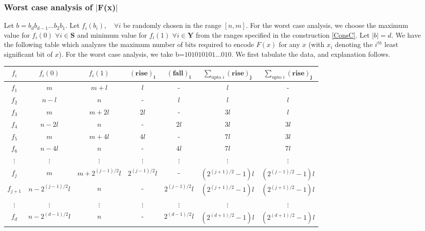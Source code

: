 \documentclass[11pt, letterpaper, romanappendices, onecolumn]{article}
\theoremstyle{plain}\newtheorem{thm}{Theorem}[section]
\theoremstyle{definition}
\theoremstyle{remark}
\begin{document}
\subsubsection{Worst case analysis of $\mid$F(x)$\mid$}
\par  Let $b=b_d b_{d-1}\ldots b_2 b_1$. Let $f_i (b_i),\quad \forall i$ be randomly chosen in the range $[n, m]$. For the worst case analysis, we choose the maximum value for $f_i(0)$ $\forall i \in \mathbf{S}$ and minimum value for $f_i(1)$ $\forall i \in \mathbf{Y}$ from the ranges specified in the construction \ref{ConsC}. Let $| b | = d$. We have the following table which analyzes the maximum number of bits required to encode $F(x)$ for any $x$ (with $x_i$ denoting the $i^{th}$ least significant bit of $x$). For the worst case analysis, we take b=$101010101 \ldots 010$. We first tabulate the data, and explanation follows.
\begin{center}
\begin{tabular}{|c|c|c|c|c|c|c|}\hline
 $f_i$ & $f_i(0)$ & $f_i(1)$ & $\mathbf{(rise)_i}$ & $\mathbf{(fall)_i}$ & $\sum\limits_{\text{upto } i} \mathbf{(rise)_j}$ & $\sum\limits_{\text{upto } i} \mathbf{(rise)_j}$ \\\hline 
 $f_1$ & $m$ & $m+l$ & $l$ & - & $l$ & - \\\hline 
 $f_2$ & $n-l$ & $n$ & - & $l$ & $l$ & $l$ \\\hline 
 $f_3$ & $m$ & $m+2l$ & $2l$ & - & $3l$ & $l$ \\\hline 
 $f_4$ & $n-2l$ & $n$ & - & $2l$ & $3l$ & $3l$ \\\hline 
 $f_5$ & $m$ & $m+4l$ & $4l$ & - & $7l$ & $3l$ \\\hline 
 $f_6$ & $n-4l$ & $n$ & - & $4l$ & $7l$ & $7l$ \\\hline 
 $\vdots$ & $\vdots$ & $\vdots$ & $\vdots$ & $\vdots$ & $\vdots$ & $\vdots$ \\\hline 
 $f_j$ & $m$ & $m+2^{(j-1)/2}l$ & $2^{(j-1)/2}l$ & - & $(2^{(j+1)/2}-1)l$ & $(2^{(j-1)/2}-1)l$ \\\hline 
 $f_{j+1}$ & $n-2^{(j-1)/2}l$ & $n$ & - & $2^{(j-1)/2}l$ & $(2^{(j+1)/2}-1)l$ & $(2^{(j+1)/2}-1)l$ \\\hline 
 $\vdots$ & $\vdots$ & $\vdots$ & $\vdots$ & $\vdots$ & $\vdots$ & $\vdots$ \\\hline 
 $f_d$ & $n-2^{(d-1)/2}l$ & $n$ & - & $2^{(d-1)/2}l$ & $(2^{(d+1)/2}-1)l$ & $(2^{(d+1)/2}-1)l$ \\\hline 
\end{tabular}
\end{center}
\end{document}
